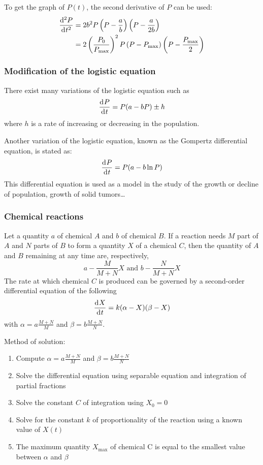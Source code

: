 \documentclass[10pt, twocolumn]{article}
\theoremstyle{definition}
\begin{document}
To get the graph of \(P(t)\), the second derivative of \(P\) can be used:
\begin{align*}
  \frac{\mathrm{d}^{2} P}{\mathrm{d}^{} t^{2}} & = 2b^2 P\left( P - \frac{a}{b} \right)\left( P - \frac{a}{2b} \right)                                                         \\
                        & = 2\left( \frac{P_0 }{P_\mathrm{max}} \right)^2 P\left( P - P_\mathrm{max} \right)\left( P - \frac{P_\mathrm{max}}{2} \right)
\end{align*}


\subsubsection*{Modification of the logistic equation}
There exist many variations of the logistic equation such as
\[
  \frac{\mathrm{d}^{} P}{\mathrm{d}^{} t} = P(a - bP) \pm h
\]
where \(h\) is a rate of increasing or decreasing in the population.

Another variation of the logistic equation, known as the Gompertz differential equation, is stated as:
\[
  \frac{\mathrm{d}^{} P}{\mathrm{d}^{} t} = P(a - b\ln{P})
\]
This differential equation is used as a model in the study of the growth or decline of population, growth of solid tumors\dots


\subsubsection*{Chemical reactions}
Let a quantity \(a\) of chemical \(A\) and \(b\) of chemical \(B\).
If a reaction needs \(M\) part of \(A\) and \(N\) parts of \(B\) to form a quantity \(X\) of a chemical \(C\), then the quantity of \(A\) and \(B\) remaining at any time are, respectively,
\[
  a - \frac{M}{M + N}X \text{ and } b - \frac{N}{M + N}X
\]
The rate at which chemical \(C\) is produced can be governed by a second-order differential equation of the following
\[
  \frac{\mathrm{d}^{} X}{\mathrm{d}^{} t} = k(\alpha - X)(\beta - X)
\]
with \(\alpha = a\frac{M + N}{M}\) and \(\beta = b\frac{M + N}{N}\).

Method of solution:
\begin{enumerate}
  \item Compute \(\alpha = a\frac{M + N}{M}\) and \(\beta = b\frac{M + N}{N}\)
  \item Solve the differential equation using separable equation and integration of partial fractions
  \item Solve the constant \(C\) of integration using \(X_0 = 0\)
  \item Solve for the constant \(k\) of proportionality of the reaction using a known value of \(X(t)\)
  \item The maximum quantity \(X_\mathrm{max}\) of chemical C is equal to the smallest value between \(\alpha\) and \(\beta\)
\end{enumerate}
\end{document}
